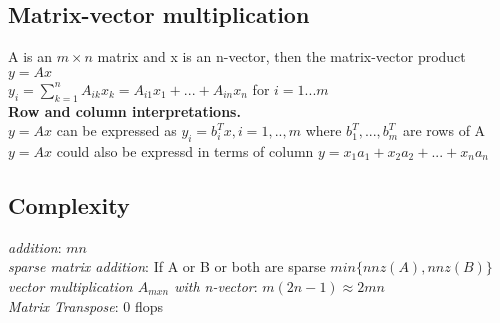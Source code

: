 \subsection{Matrix-vector multiplication}
A is an $m\times n$ matrix and x is an n-vector, then the matrix-vector product $y = Ax$\\

$y_i = \sum_{k=1}^n A_{ik} x_k =A_{i1}x_1 +...+A_{in}x_n$ for $i=1...m$\\
\textbullet \textbf{Row and column interpretations.}\\
$y = Ax$ can be expressed as $y_i=b^T_ix, i=1,..,m$ where $b^T_1,...,b^T_m$ are rows of A\\
\textbullet $y = Ax$ could also be expressd in terms of column
$y = x_1a_1 + x_2a_2 +...+ x_na_n$
\subsection{Complexity}
\textit{addition}: $mn$\\
\textit{sparse matrix addition}: If A or B or both are sparse $min\{nnz(A), nnz(B)\}$\\
\textit{vector multiplication $A_{mxn}$ with n-vector}: $m(2n-1) \approx 2mn$\\
\textit{Matrix Transpose}: 0 flops